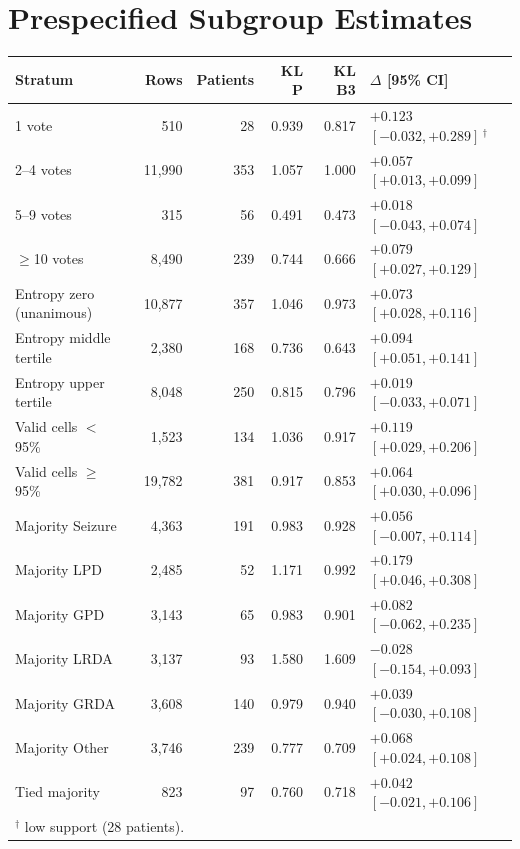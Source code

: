 \documentclass[sigconf,anonymous]{acmart}
\begin{document}



\ifdefined\ANONYMOUS\else
\appendix
\section{Prespecified Subgroup Estimates}
\noindent\begin{minipage}{\columnwidth}
\label{tab:strata}
\footnotesize
\setlength{\tabcolsep}{3.5pt}
\centering
\begin{tabular}{lrrrrl}
\toprule
Stratum & Rows & Patients & KL P & KL B3 & $\Delta$ [95\% CI] \\
\midrule
1 vote & 510 & 28 & 0.939 & 0.817 & $+0.123$ $[-0.032,+0.289]$\,$^{\dagger}$ \\
2--4 votes & 11,990 & 353 & 1.057 & 1.000 & $+0.057$ $[+0.013,+0.099]$ \\
5--9 votes & 315 & 56 & 0.491 & 0.473 & $+0.018$ $[-0.043,+0.074]$ \\
$\ge$10 votes & 8,490 & 239 & 0.744 & 0.666 & $+0.079$ $[+0.027,+0.129]$ \\
Entropy zero (unanimous) & 10,877 & 357 & 1.046 & 0.973 & $+0.073$ $[+0.028,+0.116]$ \\
Entropy middle tertile & 2,380 & 168 & 0.736 & 0.643 & $+0.094$ $[+0.051,+0.141]$ \\
Entropy upper tertile & 8,048 & 250 & 0.815 & 0.796 & $+0.019$ $[-0.033,+0.071]$ \\
Valid cells $<$ 95\% & 1,523 & 134 & 1.036 & 0.917 & $+0.119$ $[+0.029,+0.206]$ \\
Valid cells $\ge$ 95\% & 19,782 & 381 & 0.917 & 0.853 & $+0.064$ $[+0.030,+0.096]$ \\
Majority Seizure & 4,363 & 191 & 0.983 & 0.928 & $+0.056$ $[-0.007,+0.114]$ \\
Majority LPD & 2,485 & 52 & 1.171 & 0.992 & $+0.179$ $[+0.046,+0.308]$ \\
Majority GPD & 3,143 & 65 & 0.983 & 0.901 & $+0.082$ $[-0.062,+0.235]$ \\
Majority LRDA & 3,137 & 93 & 1.580 & 1.609 & $-0.028$ $[-0.154,+0.093]$ \\
Majority GRDA & 3,608 & 140 & 0.979 & 0.940 & $+0.039$ $[-0.030,+0.108]$ \\
Majority Other & 3,746 & 239 & 0.777 & 0.709 & $+0.068$ $[+0.024,+0.108]$ \\
Tied majority & 823 & 97 & 0.760 & 0.718 & $+0.042$ $[-0.021,+0.106]$ \\
\bottomrule
\multicolumn{6}{l}{$^{\dagger}$ low support (28 patients).}
\end{tabular}
\end{minipage}
\fi
\end{document}
